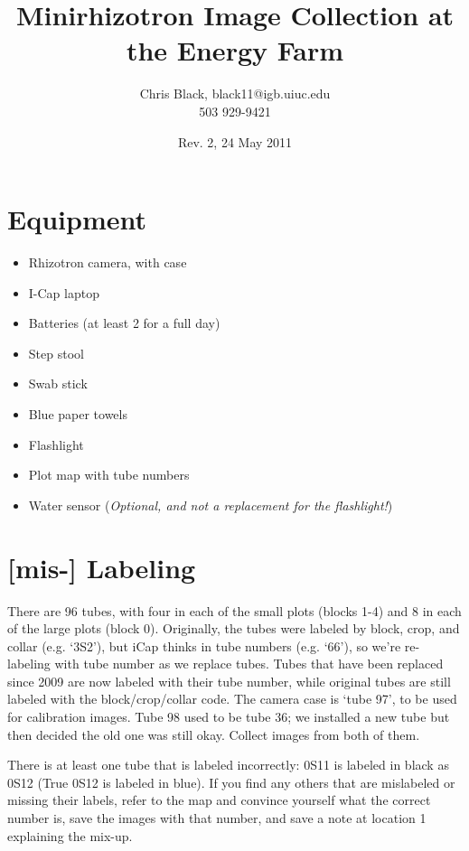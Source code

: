 \documentclass[11pt]{article}
\title{Minirhizotron Image Collection at the Energy Farm}
\author{Chris Black, black11@igb.uiuc.edu\\503 929-9421}
\date{Rev. 2, 24 May 2011}
\begin{document}
\maketitle


\section{Equipment}
	\begin{itemize}
		\item{Rhizotron camera, with case}
		\item{I-Cap laptop}
		\item{Batteries (at least 2 for a full day)}	
		\item{Step stool}
		\item{Swab stick}
		\item{Blue paper towels}
		\item{Flashlight}
		\item{Plot map with tube numbers}
		\item{Water sensor ({\it Optional, and not a replacement for the flashlight!})}
	\end{itemize}

	
\section{[mis-] Labeling} 
	There are 96 tubes, with four in each of the small plots (blocks 1-4) and 8 in each of the large plots (block 0). Originally, the tubes were labeled by block, crop, and collar (e.g. `3S2'), but iCap thinks in tube numbers (e.g. `66'), so we're re-labeling with tube number as we replace tubes. Tubes that have been replaced since 2009 are now labeled with their tube number, while original tubes are still labeled with the block/crop/collar code. The camera case is `tube 97', to be used for calibration images. Tube 98 used to be tube 36; we installed a new tube but then decided the old one was still okay. Collect images from both of them.
	
	There is at least one tube that is labeled incorrectly: 0S11 is labeled in black as 0S12 (True 0S12 is labeled in blue). If you find any others that are mislabeled or missing their labels, refer to the map and convince yourself what the correct number is, save the images with that number, and save a note at location 1 explaining the mix-up.
\end{document}
